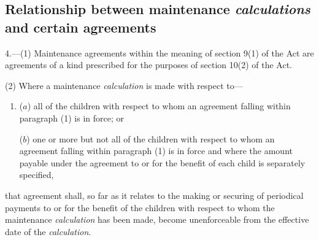 \documentclass[12pt,a4paper]{article}
\begin{document}

\subsection[4. Relationship between maintenance 
\emph{calculations} 
and certain agreements]{\sloppy Relationship between maintenance %
\emph{calculations} 
and certain agreements}

4.—(1) Maintenance agreements within the meaning of section 9(1) of the Act are agreements of a kind prescribed for the purposes of section 10(2) of the Act.

(2) Where a maintenance 
\emph{calculation} 
is made with respect to—
\begin{enumerate}\item[]
($a$) all of the children with respect to whom an agreement falling within paragraph (1) is in force; or

($b$) one or more but not all of the children with respect to whom an agreement falling within paragraph (1) is in force and where the amount payable under the agreement to or for the benefit of each child is separately specified,
\end{enumerate}
that agreement shall, so far as it relates to the making or securing of periodical payments to or for the benefit of the children with respect to whom the maintenance 
\emph{calculation} 
has been made, become unenforceable from the effective date of the 
\emph{calculation}.
\end{document}
